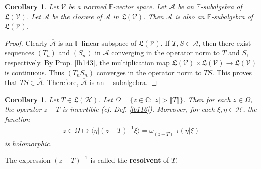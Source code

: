 \documentclass[12pt,b5paper,notitlepage]{article}
\theoremstyle{definition}
\theoremstyle{plain}
\newtheorem{co}[df]{Corollary}
\newcommand{\fk}{\mathfrak}
\newcommand{\ovl}{\overline}
\newcommand{\bk}[1]{\langle {#1}\rangle}
\newcommand{\scr}{\mathscr}
\newcommand{\Cbb}{\mathbb C}
\newcommand{\Fbb}{\mathbb F}
\newcommand{\MV}{\mathcal V}
\newcommand{\MH}{\mathcal H}
\numberwithin{equation}{section}
\begin{document}
\begin{co}
Let $\MV$ be a normed $\Fbb$-vector space. Let $\scr A$ be an $\Fbb$-subalgebra of $\fk L(\MV)$. Let $\ovl{\scr A}$ be the closure of $\scr A$ in $\fk L(\MV)$. Then $\scr A$ is also an $\Fbb$-subalgebra of $\fk L(\MV)$.
\end{co}

\begin{proof}
Clearly $\ovl{\scr A}$ is an $\Fbb$-linear subspace of $\fk L(\MV)$. If $T,S\in\scr A$, then there exist sequences $(T_n)$ and $(S_n)$ in $\scr A$ converging in the operator norm to $T$ and $S$, respectively. By Prop. \ref{lb143}, the multiplication map $\fk L(\MV)\times\fk L(\MV)\rightarrow\fk L(\MV)$ is continuous. Thus $(T_nS_n)$ converges in the operator norm to $TS$. This proves that $TS\in\ovl{\scr A}$. Therefore, $\ovl{\scr A}$ is an $\Fbb$-subalgebra.
\end{proof}



\begin{co}\label{lb233}
Let $T\in\fk L(\MH)$. Let $\Omega=\{z\in\Cbb:|z|>\Vert T\Vert\}$. Then for each $z\in\Omega$, the operator $z-T$ is invertible (cf. Def. \ref{lb116}). Moreover, for each $\xi,\eta\in\MH$, the function
\begin{align*}
z\in\Omega\mapsto \bk{\eta|(z-T)^{-1}\xi}=\omega_{(z-T)^{-1}}(\eta|\xi)
\end{align*}
is holomorphic.
\end{co}

The expression $(z-T)^{-1}$ is called the \textbf{resolvent} of $T$. 
\end{document}
